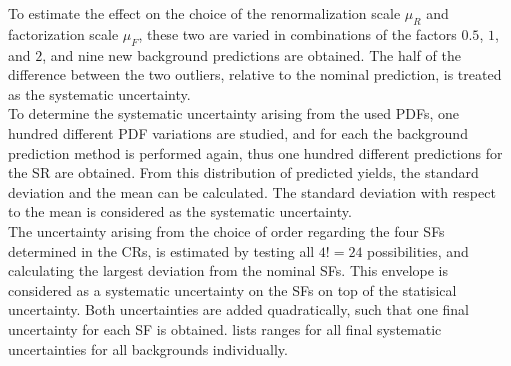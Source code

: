 To estimate the effect on the choice of the renormalization scale $\mu_R$ and factorization scale $\mu_F$, these two are varied in combinations of the factors $0.5$, $1$, and $2$, and nine new background predictions are obtained. The half of the difference between the two outliers, relative to the nominal prediction, is treated as the systematic uncertainty.\\
To determine the systematic uncertainty arising from the used PDFs, one hundred different PDF variations are studied, and for each the background prediction method is performed again, thus one hundred different predictions for the SR are obtained. From this distribution of predicted yields, the standard deviation and the mean can be calculated. The standard deviation with respect to the mean is considered as the systematic uncertainty.\\
The uncertainty arising from the choice of order regarding the four SFs determined in the CRs, is estimated by testing all $4!=24$ possibilities, and calculating the largest deviation from the nominal SFs. This envelope is considered as a systematic uncertainty on the SFs on top of the statisical uncertainty. Both uncertainties are added quadratically, such that one final uncertainty for each SF is obtained.
 lists ranges for all final systematic uncertainties for all backgrounds individually.
